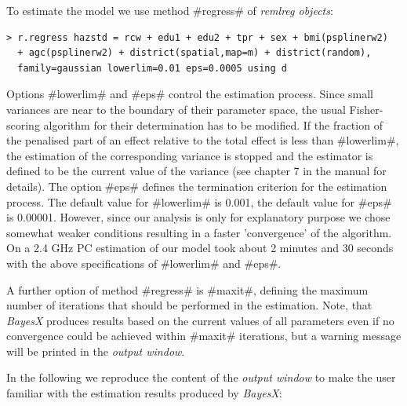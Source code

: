 \documentclass{article}
\begin{document}
To estimate the model we use method #regress# of {\em remlreg
objects}:
\begin{verbatim}
> r.regress hazstd = rcw + edu1 + edu2 + tpr + sex + bmi(psplinerw2)
  + agc(psplinerw2) + district(spatial,map=m) + district(random),
  family=gaussian lowerlim=0.01 eps=0.0005 using d
\end{verbatim}

Options #lowerlim# and #eps# control the estimation process. Since
small variances are near to the boundary of their parameter space,
the usual Fisher-scoring algorithm for their determination has to
be modified. If the fraction of the penalised part of an effect
relative to the total effect is less than #lowerlim#, the
estimation of the corresponding variance is stopped and the
estimator is defined to be the current value of the variance (see
chapter 7 in the manual for details). The option #eps# defines the
termination criterion for the estimation process. The default
value for #lowerlim# is 0.001, the default value for #eps# is
0.00001. However, since our analysis is only for explanatory
purpose we chose somewhat weaker conditions resulting in a faster
'convergence' of the algorithm. On a 2.4 GHz PC estimation of our
model took about 2 minutes and 30 seconds with the above
specifications of #lowerlim# and #eps#.

A further option of method #regress# is #maxit#, defining the
maximum number of iterations that should be performed in the
estimation. Note, that {\it BayesX} produces results based on the
current values of all parameters even if no convergence could be
achieved within #maxit# iterations, but a warning message will be
printed in the {\it output window}.

In the following we reproduce the content of the {\em output
window} to make the user familiar with the estimation results
produced by {\em BayesX}:
\end{document}
